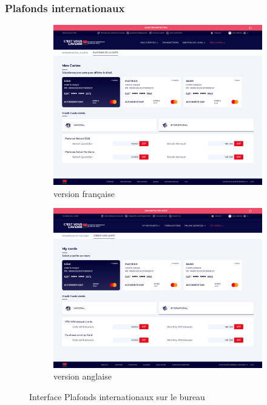 \subsubsection*{Plafonds internationaux}
\begin{figure}[!ht]
    \centering
    \begin{subfigure}[b]{0.49\textwidth}
        \centering
        \includegraphics[width=\textwidth]{images/screens/plafondsInter/desktop.png}
        \caption{version française}
    \end{subfigure}
    \hfill
    \begin{subfigure}[b]{0.49\textwidth}
        \centering
        \includegraphics[width=\textwidth]{images/screens/limitsInter/desktop.png}
        \caption{version anglaise}
    \end{subfigure}
       \caption{Interface Plafonds internationaux sur le bureau}
\end{figure}

